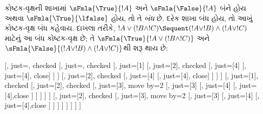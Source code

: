\documentclass[../../../include/open-logic-section]{subfiles}
\begin{document}
કોષ્ટક-વૃક્ષની શાખામાં
$\sFmla{\True}{!A}$ અને $\sFmla{\False}{!A}$
બંને હોય અથવા $\sFmla{\True}{\lfalse}$ હોય,
તો તે \emph{બંધ} છે. દરેક શાખા બંધ
હોય, તો આખું કોષ્ટક-વૃક્ષ બંધ કહેવાય.
દાખલા તરીકે,
$!A \lor (!B \land !C) \Sequent (!A \lor !B) \land
(!A \lor !C)$ માટેનું આ બંધ કોષ્ટક-વૃક્ષ છે;
તે $\sFmla{\True}{!A \lor (!B \land !C)}$
અને $\sFmla{\False}{(!A \lor !B) \land (!A \lor !C)}$થી
શરૂ થાય છે:
\begin{maxwidth}
  \begin{tableau}{}
  [,
    just=\TAss, checked
    [, just=\TAss, checked
      [, just={\TRule{\True}{\lor}[1]}
        [,
          just={\TRule{\False}{\land}[2]}, checked
          [,
            just={\TRule{\False}{\lor}[4]}
            [,
              just={\TRule{\False}{\lor}[4]}, close]
          ]
        ]
        [,
          just={\TRule{\False}{\land}[2]}, checked
          [,
            just={\TRule{\False}{\lor}[4]}
            [,
              just={\TRule{\False}{\lor}[4]}, close]
          ]
        ]
      ]
      [,
        just={\TRule{\True}{\lor}[1]}, checked
        [,
          just={\TRule{\False}{\land}[2]}, checked
          [,
            just={\TRule{\True}{\land}[3]}, move by=2
            [,
              just={\TRule{\True}{\land}[3]}
              [,
                just={\TRule{\False}{\lor}[4]}
                [,
                  just={\TRule{\False}{\lor}[4]},close
                ]
              ]
            ]
          ]
        ]
        [,
          just={\TRule{\False}{\land}[2]}, checked
          [,
            just={\TRule{\True}{\land}[3]}, move by=2
              [,
                just={\TRule{\True}{\land}[3]}
                [,
                  just={\TRule{\False}{\lor}[4]}
                  [,
                  just={\TRule{\False}{\lor}[4]},close
                ]
              ]
            ]
          ]
        ]
      ]
    ]
  ]
  \end{tableau}
\end{maxwidth}
\end{document}
